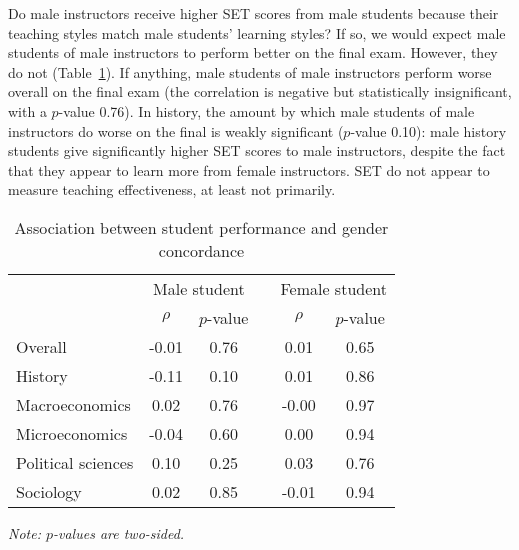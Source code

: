 \documentclass[12pt]{article}
\begin{document}
Do male instructors receive higher SET scores from male students because their teaching styles match male students' learning styles? 
If so, we would expect male students of male instructors to perform better on the final exam. 
However, they do not (Table~\ref{tab:finalconcordance}). 
If anything, male students of male instructors perform worse overall on the final exam (the correlation is negative but statistically insignificant, with a $p$-value 0.76). 
In history, the amount by which male students of male instructors do worse on the final
is weakly significant ($p$-value 0.10):
male history students give significantly higher SET scores to male instructors, despite the fact that 
they appear to learn more from female instructors. 
SET do not appear to measure teaching effectiveness, at least not primarily.

\begin{table}[htbp]
  \centering
  \footnotesize 
  \caption{Association between student performance and gender concordance}
    \begin{tabular}{lccccc}
    \toprule 
          & \multicolumn{2}{c}{Male student}  &  & \multicolumn{2}{c}{Female student} \\
      & $\rho$  &  $p$-value &  & $\rho$  &  $p$-value    \\
                             \midrule
      \quad  Overall &                 -0.01       & 0.76 & &  0.01       & 0.65  \\
      \quad  History &                 -0.11       & 0.10 & &  0.01       & 0.86   \\
      \quad  Macroeconomics &           0.02       & 0.76 & & -0.00       & 0.97   \\
      \quad  Microeconomics &          -0.04       & 0.60 & &  0.00       & 0.94  \\
      \quad  Political sciences &       0.10       & 0.25 & &  0.03       & 0.76  \\
      \quad  Sociology &                0.02       & 0.85 & & -0.01       & 0.94  \\
    \bottomrule
    \end{tabular}%
 \label{tab:finalconcordance}%
  
  \textit{Note: $p$-values are two-sided.}
\end{table}%
\normalsize
\end{document}
